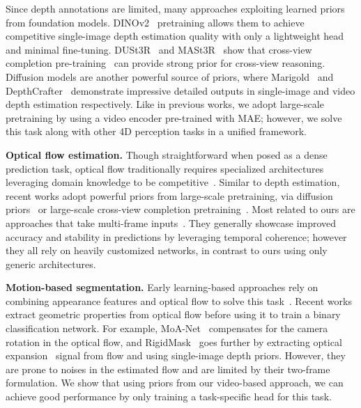 Since depth annotations are limited, many approaches exploiting learned priors from foundation models.
DINOv2~\cite{oquab2023dinov2} pretraining allows them to achieve competitive single-image depth estimation quality with only a lightweight head and minimal fine-tuning.
DUSt3R~\cite{wang2024dust3r} and MASt3R~\cite{leroy2024mast3r} show that cross-view completion pre-training~\cite{weinzaepfel2023croco} can provide strong prior for cross-view reasoning. 
Diffusion models are another powerful source of priors, where Marigold~\cite{ke2024repurposing} and DepthCrafter~\cite{hu2024depthcrafter} demonstrate impressive detailed outputs in single-image and video depth estimation respectively.
Like in previous works, we adopt large-scale pretraining by using a video encoder pre-trained with MAE; however, we solve this task along with other 4D perception tasks in a unified framework.

\noindent
\textbf{Optical flow estimation.}
Though straightforward when posed as a dense prediction task, optical flow traditionally requires specialized architectures leveraging domain knowledge to be competitive~\cite{teed2020raft,sun2018pwc,wang2024gflow,xu2023unifying}.
Similar to depth estimation, recent works adopt powerful priors from large-scale pretraining, \eg via diffusion priors~\cite{saxena2024surprising} or large-scale cross-view completion pretraining~\cite{weinzaepfel2023croco}.
Most related to ours are approaches that take multi-frame inputs~\cite{ren2019fusion,janai2018unsupervised,shi2023videoflow,dong2024memflow}.
They generally showcase improved accuracy and stability in predictions by leveraging temporal coherence; 
however they all rely on heavily customized networks, in contrast to ours using only generic architectures.

\noindent
\textbf{Motion-based segmentation.}
Early learning-based approaches rely on combining appearance features and optical flow to solve this task~\cite{bharadhwaj2024track2act,fragkiadaki2015motionseg,jain2017fusionseg,Tokmakov2017motionv2,Tokmakov2017motionv1}.
Recent works extract geometric properties from optical flow before using it to train a binary classification network. 
For example, MoA-Net~\cite{bideau2019moanet} compensates for the camera rotation in the optical flow, and RigidMask~\cite{yang2021rigidmotion} goes further by extracting optical expansion~\cite{yang2020upgrading} signal from flow and using single-image depth priors.
However, they are prone to noises in the estimated flow and are limited by their two-frame formulation.
We show that using priors from our video-based approach, we can achieve good performance by only training a task-specific head for this task.

